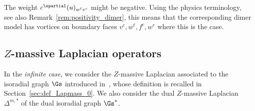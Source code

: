 \documentclass[a4paper,twoside,11pt]{article}
\begin{document}
\begin{rem}
The weight $c^\spartial(u)_{w^\ell v^c}$ might be negative. Using the physics terminology, see also Remark~\ref{rem:positivity_dimer}, 
this means that the
corresponding dimer model has vortices on boundary faces $v^c,w^\ell,f^c,w^r$ where this is the case.
\end{rem}




\subsection{$Z$-massive Laplacian operators}\label{sec:def_Lap}

In the \emph{infinite case}, we consider the $Z$-massive Laplacian associated to the isoradial graph $\Gs$
introduced in~\cite{BdTR1}, whose definition is recalled in Section~\ref{sec:def_Lapmass_0}. We also consider the 
dual $Z$-massive Laplacian $\Delta^{m,*}$ of the dual isoradial graph $\Gs^*$.
\end{document}
